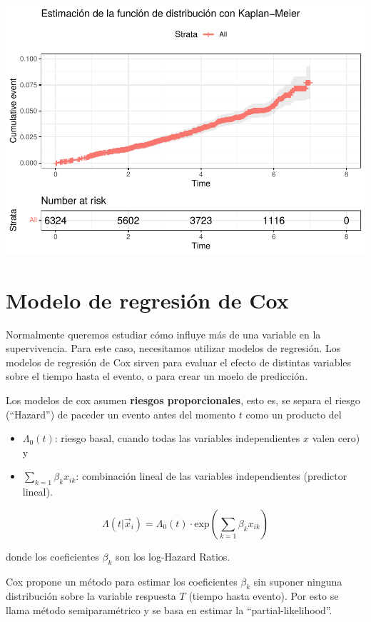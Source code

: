 \documentclass[
]{book}
\begin{document}
\includegraphics{fig_out/unnamed-chunk-157-1.pdf}

\hypertarget{modelo-de-regresiuxf3n-de-cox}{%
\section{Modelo de regresión de Cox}\label{modelo-de-regresiuxf3n-de-cox}}

Normalmente queremos estudiar cómo influye más de una variable en la supervivencia. Para este caso, necesitamos utilizar modelos de regresión. Los modelos de regresión de Cox sirven para evaluar el efecto de distintas variables sobre el tiempo hasta el evento, o para crear un moelo de predicción.

Los modelos de cox asumen \textbf{riesgos proporcionales}, esto es, se separa el riesgo (``Hazard'') de paceder un evento antes del momento \(t\) como un producto del

\begin{itemize}
\item
  \(\Lambda_0(t)\): riesgo basal, cuando todas las variables independientes \(x\) valen cero) y
\item
  \(\sum_{k=1} \beta_k x_{ik}\): combinación lineal de las variables independientes (predictor lineal).
\end{itemize}

\[\Lambda(t|\vec{x}_i) = \Lambda_0(t)\cdot \text{exp}\left(\sum_{k=1} \beta_k x_{ik}\right)\]

donde los coeficientes \(\beta_k\) son los log-Hazard Ratios.

Cox propone un método para estimar los coeficientes \(\beta_k\) sin suponer ninguna distribución sobre la variable respuesta \(T\) (tiempo hasta evento). Por esto se llama método semiparamétrico y se basa en estimar la ``partial-likelihood''.
\end{document}
